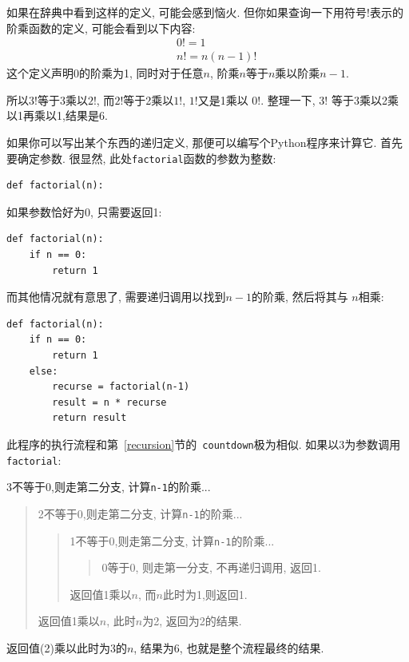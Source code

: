 \documentclass[10pt]{book}
\begin{document}
如果在辞典中看到这样的定义, 可能会感到恼火. 
但你如果查询一下用符号$!$表示的阶乘函数的定义, 
可能会看到以下内容:
%
\begin{eqnarray*}
&&  0! = 1 \\
&&  n! = n (n-1)!
\end{eqnarray*}
%
这个定义声明0的阶乘为1, 同时对于任意$n$, 阶乘$n$等于$n$乘以阶乘$n-1$. 

所以$3!$等于3乘以$2!$,  而$2!$等于2乘以$1!$, $1!$又是1乘以
$0!$. 整理一下, $3!$ 等于3乘以2乘以1再乘以1,结果是6.

如果你可以写出某个东西的递归定义, 那便可以编写个Python程序来计算它. 
首先要确定参数. 很显然, 此处{\tt factorial}函数的参数为整数:

\begin{verbatim}
def factorial(n):
\end{verbatim}
%
如果参数恰好为0, 只需要返回1:

\begin{verbatim}
def factorial(n):
    if n == 0:
        return 1
\end{verbatim}
%
而其他情况就有意思了, 需要递归调用以找到$n-1$的阶乘, 然后将其与
$n$相乘:

\begin{verbatim}
def factorial(n):
    if n == 0:
        return 1
    else:
        recurse = factorial(n-1)
        result = n * recurse
        return result
\end{verbatim}
%
此程序的执行流程和第~\ref{recursion}节的{\tt
countdown}极为相似. 如果以3为参数调用{\tt factorial}:

3不等于0,则走第二分支, 计算{\tt n-1}的阶乘...

\begin{quote}
2不等于0,则走第二分支, 计算{\tt n-1}的阶乘...


  \begin{quote}
 1不等于0,则走第二分支, 计算{\tt n-1}的阶乘...


    \begin{quote}
   0等于0, 则走第一分支, 不再递归调用, 返回1.
    \end{quote}

  返回值1乘以$n$, 而$n$此时为1,则返回1. 
  \end{quote}

返回值1乘以$n$, 此时$n$为2, 返回为2的结果.
\end{quote}

返回值(2)乘以此时为3的$n$, 结果为6, 也就是整个流程最终的结果. 
\end{document}
